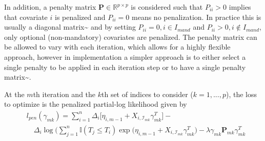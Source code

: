 \documentclass[
  letterpaper,
]{scrbook}
\theoremstyle{plain}
\theoremstyle{definition}
\theoremstyle{remark}
\begin{document}
In addition, a penalty matrix \(\mathbf{P} \in \mathbb{R}^{p \times p}\)
is considered such that \(P_{ii} > 0\) implies that covariate \(i\) is
penalized and \(P_{ii} = 0\) means no penalization. In practice this is
usually a diagonal matrix\textasciitilde{}\cite{Binder2008} and by
setting \(P_{ii} = 0, i \in I_{mand}\) and
\(P_{ii} > 0, i \not\in I_{mand}\), only optional (non-mandatory)
covariates are penalized. The penalty matrix can be allowed to vary with
each iteration, which allows for a highly flexible approach, however in
implementation a simpler approach is to either select a single penalty
to be applied in each iteration step or to have a single penalty
matrix\textasciitilde{}\cite{pkgcoxboost}.

At the \(m\)th iteration and the \(k\)th set of indices to consider
(\(k = 1,...,p\)), the loss to optimize is the penalized partial-log
likelihood given by \[
\begin{split}
&l_{pen}(\gamma_{mk}) = \sum^n_{i=1} \Delta_i \Big[\eta_{i,m-1} + X_{i,\mathcal{I}_{mk}}\gamma^T_{mk}\Big] - \\
&\quad\Delta_i\log\Big(\sum^n_{j = 1} \mathbb{I}(T_j \leq T_i) \exp(\eta_{i,{m-1}} + X_{i, \mathcal{I}_{mk}}\gamma^T_{mk}\Big) - \lambda\gamma_{mk}\mathbf{P}_{mk}\gamma^T_{mk}
\end{split}
\]
\end{document}
